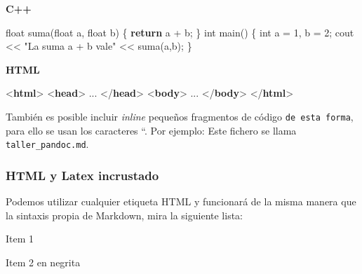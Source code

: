 \documentclass[
  spanish,
]{article}
\newenvironment{Shaded}{}{}
\newcommand{\ControlFlowTok}[1]{\textcolor[rgb]{0.00,0.44,0.13}{\textbf{#1}}}
\newcommand{\DataTypeTok}[1]{\textcolor[rgb]{0.56,0.13,0.00}{#1}}
\newcommand{\DecValTok}[1]{\textcolor[rgb]{0.25,0.63,0.44}{#1}}
\newcommand{\KeywordTok}[1]{\textcolor[rgb]{0.00,0.44,0.13}{\textbf{#1}}}
\newcommand{\NormalTok}[1]{#1}
\newcommand{\OperatorTok}[1]{\textcolor[rgb]{0.40,0.40,0.40}{#1}}
\newcommand{\StringTok}[1]{\textcolor[rgb]{0.25,0.44,0.63}{#1}}
\begin{document}
\textbf{C++}

\begin{Shaded}
\begin{Highlighting}[]
\DataTypeTok{float}\NormalTok{ suma}\OperatorTok{(}\DataTypeTok{float}\NormalTok{ a}\OperatorTok{,} \DataTypeTok{float}\NormalTok{ b}\OperatorTok{)} \OperatorTok{\{}
    \ControlFlowTok{return}\NormalTok{ a }\OperatorTok{+}\NormalTok{ b}\OperatorTok{;}
\OperatorTok{\}}
\DataTypeTok{int}\NormalTok{ main}\OperatorTok{()} \OperatorTok{\{}
    \DataTypeTok{int}\NormalTok{ a }\OperatorTok{=} \DecValTok{1}\OperatorTok{,}\NormalTok{ b }\OperatorTok{=} \DecValTok{2}\OperatorTok{;}
\NormalTok{    cout }\OperatorTok{\textless{}\textless{}} \StringTok{"La suma a + b vale"} \OperatorTok{\textless{}\textless{}}\NormalTok{ suma}\OperatorTok{(}\NormalTok{a}\OperatorTok{,}\NormalTok{b}\OperatorTok{);}
\OperatorTok{\}}
\end{Highlighting}
\end{Shaded}

\textbf{HTML}

\begin{Shaded}
\begin{Highlighting}[]
\DataTypeTok{\textless{}}\KeywordTok{html}\DataTypeTok{\textgreater{}}
    \DataTypeTok{\textless{}}\KeywordTok{head}\DataTypeTok{\textgreater{}}
\NormalTok{        ...}
    \DataTypeTok{\textless{}/}\KeywordTok{head}\DataTypeTok{\textgreater{}}
    \DataTypeTok{\textless{}}\KeywordTok{body}\DataTypeTok{\textgreater{}}
\NormalTok{        ...}
    \DataTypeTok{\textless{}/}\KeywordTok{body}\DataTypeTok{\textgreater{}}
\DataTypeTok{\textless{}/}\KeywordTok{html}\DataTypeTok{\textgreater{}}
\end{Highlighting}
\end{Shaded}

También es posible incluir \emph{inline} pequeños fragmentos de código
\texttt{de\ esta\ forma}, para ello se usan los caracteres ``. Por
ejemplo: Este fichero se llama \texttt{taller\_pandoc.md}.

\subsubsection{HTML y Latex incrustado}\label{html-y-latex-incrustado}

Podemos utilizar cualquier etiqueta HTML y funcionará de la misma manera
que la sintaxis propia de Markdown, mira la siguiente lista:

Item 1

Item 2 en negrita
\end{document}
